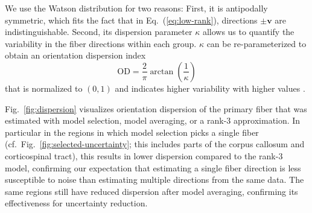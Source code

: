 We use the Watson distribution for two reasons: First, it is antipodally symmetric,
which fits the fact that in Eq.~(\ref{eq:low-rank}), directions $\pm \mathbf{v}$
are indistinguishable. Second, its dispersion parameter $\kappa$ allows us to quantify the variability in the fiber directions within each group. $\kappa$ can be re-parameterized to obtain an orientation dispersion index
\[ \mathrm{OD} = \frac{2}{\pi} \arctan \left( \frac{1}{\kappa} \right) \]
that is normalized to $(0,1)$ and indicates higher variability with higher values \cite{dispersionParameter}.

Fig.~\ref{fig:dispersion} visualizes orientation dispersion of the primary fiber that was estimated with model selection, model averaging, or a rank-3 approximation. In particular in the regions in which model selection picks a single fiber (cf.\ Fig.~\ref{fig:selected-uncertainty}; this includes parts of the corpus callosum and corticospinal tract), this results in lower dispersion 
compared to the rank-$3$ model, confirming our expectation that estimating a single fiber direction is less susceptible to noise than estimating multiple directions from the same data. The same regions still have reduced dispersion after model averaging, confirming its effectiveness for uncertainty reduction.




